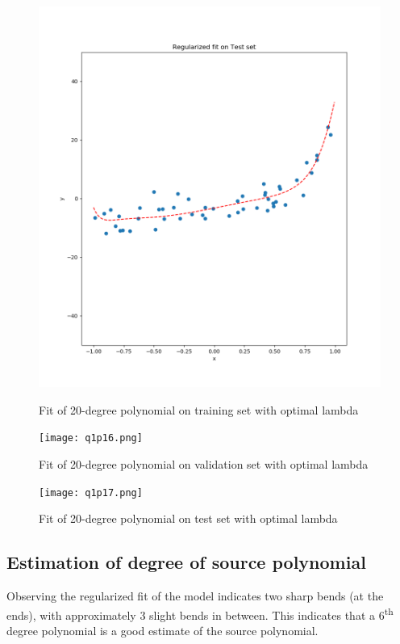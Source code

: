 \documentclass[paper=a4, fontsize=11pt]{scrartcl} %
\numberwithin{equation}{section} %
\numberwithin{figure}{section} %
\numberwithin{table}{section} %
\begin{document}
\begin{figure}[H]
    \includegraphics[width=\linewidth]{q1p15.png}
    \caption{Fit of 20-degree polynomial on training set with optimal lambda}
    \label{fig:q1p15}
    \vspace{0.5cm}
    \texttt{[image: q1p16.png]}
    \caption{Fit of 20-degree polynomial on validation set with optimal lambda}
    \label{fig:q1p16}
\end{figure}
\begin{figure}[H]
    \texttt{[image: q1p17.png]}
    \caption{Fit of 20-degree polynomial on test set with optimal lambda}
    \label{fig:q1p17}
\end{figure}

\subsection{Estimation of degree of source polynomial}

Observing the regularized fit of the model indicates two sharp bends (at the ends), with approximately 3 slight bends in between. This indicates that a 6\textsuperscript{th} degree polynomial is a good estimate of the source polynomial.
\end{document}
